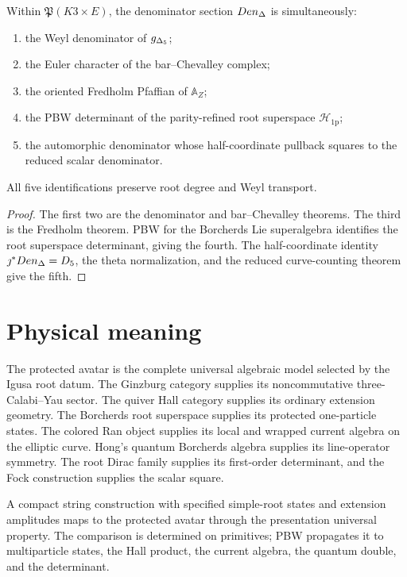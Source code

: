 \begin{theorem}
Within $\mathfrak P(K3\times E)$, the denominator section $Den_{\Delta}$ is simultaneously:
\begin{enumerate}
\item the Weyl denominator of ${g_{\Delta_5}}$;
\item the Euler character of the bar--Chevalley complex;
\item the oriented Fredholm Pfaffian of $\mathbb A_Z$;
\item the PBW determinant of the parity-refined root superspace $\mathcal H_{\mathrm{1p}}$;
\item the automorphic denominator whose half-coordinate pullback squares to the reduced scalar denominator.
\end{enumerate}
All five identifications preserve root degree and Weyl transport.
\end{theorem}
\begin{proof}
The first two are the denominator and bar--Chevalley theorems.  The third is the Fredholm theorem.  PBW for the Borcherds Lie superalgebra identifies the root superspace determinant, giving the fourth.  The half-coordinate identity $\jmath^*Den_{\Delta}=D_5$, the theta normalization, and the reduced curve-counting theorem give the fifth.
\end{proof}

\chapter{Physical meaning}
The protected avatar is the complete universal algebraic model selected by the Igusa root datum.  The Ginzburg category supplies its noncommutative three-Calabi--Yau sector.  The quiver Hall category supplies its ordinary extension geometry.  The Borcherds root superspace supplies its protected one-particle states.  The colored Ran object supplies its local and wrapped current algebra on the elliptic curve.  Hong's quantum Borcherds algebra supplies its line-operator symmetry.  The root Dirac family supplies its first-order determinant, and the Fock construction supplies the scalar square.

A compact string construction with specified simple-root states and extension amplitudes maps to the protected avatar through the presentation universal property.  The comparison is determined on primitives; PBW propagates it to multiparticle states, the Hall product, the current algebra, the quantum double, and the determinant.


